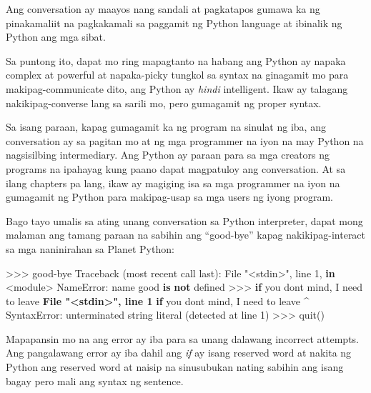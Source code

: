 \documentclass[10pt,]{book}
\newenvironment{Shaded}{}{}
\newcommand{\ControlFlowTok}[1]{\textcolor[rgb]{0.00,0.44,0.13}{\textbf{#1}}}
\newcommand{\DecValTok}[1]{\textcolor[rgb]{0.25,0.63,0.44}{#1}}
\newcommand{\ErrorTok}[1]{\textcolor[rgb]{1.00,0.00,0.00}{\textbf{#1}}}
\newcommand{\KeywordTok}[1]{\textcolor[rgb]{0.00,0.44,0.13}{\textbf{#1}}}
\newcommand{\NormalTok}[1]{#1}
\newcommand{\OperatorTok}[1]{\textcolor[rgb]{0.40,0.40,0.40}{#1}}
\newcommand{\PreprocessorTok}[1]{\textcolor[rgb]{0.74,0.48,0.00}{#1}}
\newcommand{\StringTok}[1]{\textcolor[rgb]{0.25,0.44,0.63}{#1}}
\begin{document}
Ang conversation ay maayos nang sandali at pagkatapos gumawa ka ng
pinakamaliit na pagkakamali sa paggamit ng Python language at ibinalik
ng Python ang mga sibat.

Sa puntong ito, dapat mo ring mapagtanto na habang ang Python ay napaka
complex at powerful at napaka-picky tungkol sa syntax na ginagamit mo
para makipag-communicate dito, ang Python ay \emph{hindi} intelligent.
Ikaw ay talagang nakikipag-converse lang sa sarili mo, pero gumagamit ng
proper syntax.

Sa isang paraan, kapag gumagamit ka ng program na sinulat ng iba, ang
conversation ay sa pagitan mo at ng mga programmer na iyon na may Python
na nagsisilbing intermediary. Ang Python ay paraan para sa mga creators
ng programs na ipahayag kung paano dapat magpatuloy ang conversation. At
sa ilang chapters pa lang, ikaw ay magiging isa sa mga programmer na
iyon na gumagamit ng Python para makipag-usap sa mga users ng iyong
program.

Bago tayo umalis sa ating unang conversation sa Python interpreter,
dapat mong malaman ang tamang paraan na sabihin ang ``good-bye'' kapag
nakikipag-interact sa mga naninirahan sa Planet Python:

\begin{Shaded}
\begin{Highlighting}[]
\OperatorTok{\textgreater{}\textgreater{}\textgreater{}}\NormalTok{ good}\OperatorTok{{-}}\NormalTok{bye}
\NormalTok{Traceback (most recent call last):}
\NormalTok{  File }\StringTok{"\textless{}stdin\textgreater{}"}\NormalTok{, line }\DecValTok{1}\NormalTok{, }\KeywordTok{in} \OperatorTok{\textless{}}\NormalTok{module}\OperatorTok{\textgreater{}}
\PreprocessorTok{NameError}\NormalTok{: name }\StringTok{\textquotesingle{}good\textquotesingle{}} \KeywordTok{is} \KeywordTok{not}\NormalTok{ defined}
\OperatorTok{\textgreater{}\textgreater{}\textgreater{}} \ControlFlowTok{if}\NormalTok{ you don}\StringTok{\textquotesingle{}t mind, I need to leave}
\ErrorTok{  File "\textless{}stdin\textgreater{}", line 1}
    \ControlFlowTok{if}\NormalTok{ you don}\StringTok{\textquotesingle{}t mind, I need to leave}
\ErrorTok{              \^{}}
\PreprocessorTok{SyntaxError}\NormalTok{: unterminated string literal (detected at line }\DecValTok{1}\NormalTok{)}
\OperatorTok{\textgreater{}\textgreater{}\textgreater{}}\NormalTok{ quit()}
\end{Highlighting}
\end{Shaded}

Mapapansin mo na ang error ay iba para sa unang dalawang incorrect
attempts. Ang pangalawang error ay iba dahil ang \emph{if} ay isang
reserved word at nakita ng Python ang reserved word at naisip na
sinusubukan nating sabihin ang isang bagay pero mali ang syntax ng
sentence.
\end{document}
